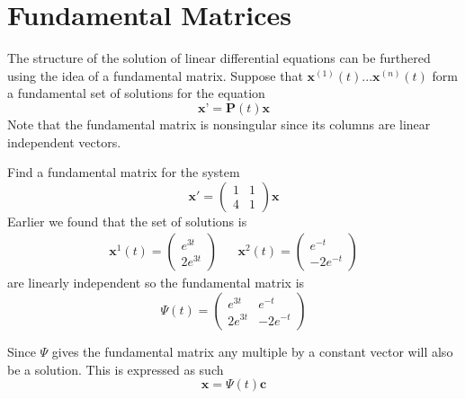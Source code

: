 \section{Fundamental Matrices}
	The structure of the solution of linear differential equations can be furthered using the idea of a fundamental matrix. Suppose that $ \textbf{x}^{(1)}(t)...\textbf{x}^{(n)}(t)$ form a fundamental set of solutions for the equation \[ \textbf{x'} = \textbf{P}(t)\textbf{x} \] Note that the fundamental matrix is nonsingular since its columns are linear independent vectors. 
	\begin{example}
		Find a fundamental matrix for the system \[ \textbf{x}' = \left(\begin{matrix}
		1 & 1 \\ 4 & 1 
		\end{matrix}\right) \textbf{x}\]
		Earlier we found that the set of solutions is 
		\begin{align*}
			\textbf{x}^1 (t) = \left(\begin{matrix}
				e^{3t} \\ 2e^{3t}
				\end{matrix}\right) && 
				\textbf{x}^2 (t) = \left(\begin{matrix}
				e^{-t} \\ -2e^{-t}
				\end{matrix}\right)
		\end{align*}
		are linearly independent so the fundamental matrix is 
		\[ \Psi(t) = \left(\begin{matrix}
				e^{3t} & e^{-t} \\ 2e^{3t} & -2e^{-t}
		\end{matrix}\right) \]
	\end{example}
	Since $ \Psi $ gives the fundamental matrix any multiple by a constant vector will also be a solution. This is expressed as such 
	\[ \textbf{x} = \Psi(t) \textbf{c} \]

